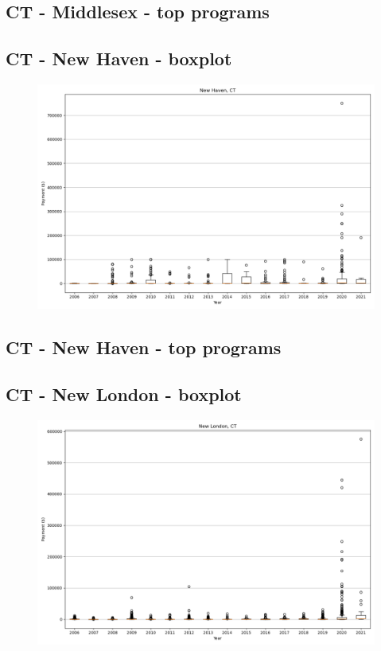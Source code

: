 \subsection*{CT - Middlesex - top programs}

\newpage
\subsection*{CT - New Haven - boxplot}
\begin{figure}[h]
\centering
\includegraphics[width=7in]{../output/boxplots/counties/New Haven-CT_boxplot.png}
\end{figure}


\subsection*{CT - New Haven - top programs}

\newpage
\subsection*{CT - New London - boxplot}
\begin{figure}[h]
\centering
\includegraphics[width=7in]{../output/boxplots/counties/New London-CT_boxplot.png}
\end{figure}


